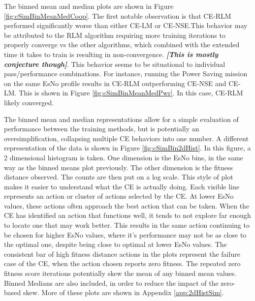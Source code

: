 \par The binned mean and median plots are shown in Figure \ref{fig:cSimBinMeanMedCoop}. The first notable observation is that CE-RLM performed significantly worse than either CE-LM or CE-NSE.This behavior may be attributed to the RLM algorithm requiring more training iterations to properly converge vs the other algorithms, which combined with the extended time it takes to train is resulting in non-convergence. \textbf{\textit{[This is mostly conjecture though]}}. This behavior seems to be situational to individual pass/performance combinations. For instance, running the Power Saving mission on the same EsNo profile results in CE-RLM outperforming CE-NSE and CE-LM. This is shown in Figure \ref{fig:cSimBinMeanMedPwr}. In this case, CE-RLM likely converged.   

\par The binned mean and median representations allow for a simple evaluation of performance between the training methods, but is potentially an oversimplification, collapsing multiple CE behaviors into one number. A different representation of the data is shown in Figure \ref{fig:cSimBin2dHist}. In this figure, a 2 dimensional histogram is taken. One dimension is the EsNo bins, in the same way as the binned means plot previously. The other dimension is the fitness distance observed. The counts are then put on a log scale. This style of plot makes it easier to understand what the CE is actually doing. Each visible line represents an action or cluster of actions selected by the CE. At lower EsNo values, these actions often approach the best action that can be taken. When the CE has identified an action that functions well, it tends to not explore far enough to locate one that may work better. This results in the same action continuing to be chosen for higher EsNo values, where it's performance may not be as close to the optimal one, despite being close to optimal at lower EsNo values. The consistent bar of high fitness distance actions in the plots represent the failure case of the CE, when the action chosen reports zero fitness. The repeated zero fitness score iterations potentially skew the mean of any binned mean values. Binned Medians are also included, in order to reduce the impact of the zero-based skew. More of these plots are shown in Appendix \ref{app:2dHistSim}.

